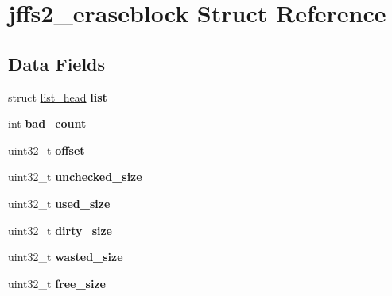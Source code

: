 \hypertarget{structjffs2__eraseblock}{}\section{jffs2\+\_\+eraseblock Struct Reference}
\label{structjffs2__eraseblock}
\subsection*{Data Fields}
\begin{DoxyCompactItemize}
\item 
\mbox{\label{structjffs2__eraseblock_ae5c04236af3346899a81d82923caf9ce}} 
struct \mbox{\hyperlink{structlist__head}{list\+\_\+head}} {\bfseries list}
\item 
\mbox{\label{structjffs2__eraseblock_a174a2f481193e295dffb437fb397c685}} 
int {\bfseries bad\+\_\+count}
\item 
\mbox{\label{structjffs2__eraseblock_aed33d01a57c6b17f654ddffbe84178df}} 
uint32\+\_\+t {\bfseries offset}
\item 
\mbox{\label{structjffs2__eraseblock_af258fd98faeeb349df6147c367cfa3f0}} 
uint32\+\_\+t {\bfseries unchecked\+\_\+size}
\item 
\mbox{\label{structjffs2__eraseblock_ab69ecd39d79b56c6e19e755071b85113}} 
uint32\+\_\+t {\bfseries used\+\_\+size}
\item 
\mbox{\label{structjffs2__eraseblock_a78a49c20d3549f3da3d80e4799fded90}} 
uint32\+\_\+t {\bfseries dirty\+\_\+size}
\item 
\mbox{\label{structjffs2__eraseblock_a37c2e42daf526b7075f75472d0e515b2}} 
uint32\+\_\+t {\bfseries wasted\+\_\+size}
\item 
\mbox{\label{structjffs2__eraseblock_aa8b5fa29d4ee2ba3d69e4a6684183557}} 
uint32\+\_\+t {\bfseries free\+\_\+size}
\item 
\mbox{\label{structjffs2__eraseblock_a014b1d24038a73f52d26c1d8a9f129da}} 

\end{DoxyCompactItemize}
